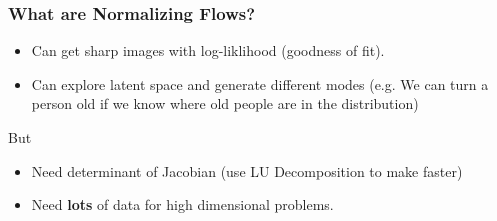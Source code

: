 \begin{frame}
    \frametitle{What are Normalizing Flows?}
    \begin{itemize}
        \item Can get sharp images with log-liklihood (goodness of fit).
        \item Can explore latent space and generate different modes (e.g. We can
            turn a person old if we know where old people are in the
            distribution)
    \end{itemize}
    \pause
    But
    \begin{itemize}
        \item Need determinant of Jacobian (use LU Decomposition to make
            faster)
        \item Need \textbf{lots} of data for high dimensional problems.
    \end{itemize}
\end{frame}

